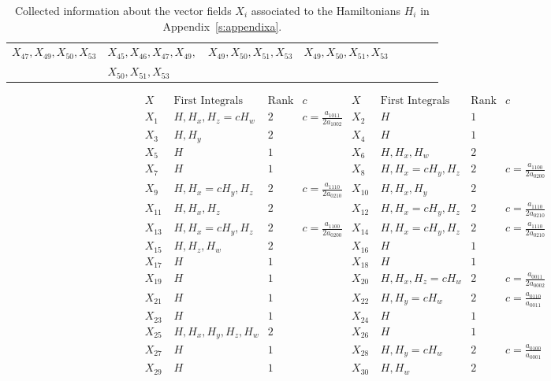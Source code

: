 \documentclass[11pt]{article}
\begin{document}
\begin{center}
\begin{table}[H]
\begin{tabular}{|l|l|l|l|l|l|l|l|}
$X_{47}, X_{49},X_{50},X_{53}$
& $X_{45},X_{46},X_{47},X_{49},$
&$X_{49},X_{50},X_{51},X_{53}$
&$X_{49},X_{50},X_{51},X_{53}$ \\



&$X_{50},X_{51},X_{53}$
& &
\\
  \hline
\end{tabular}
\caption{Collected information about the vector fields $X_i$ associated to the Hamiltonians $H_i$ in  Appendix~\ref{s:appendixa}.}\label{t:table1}
\end{table}
\end{center}




\begin{table}
{\small
 $$
\begin{array}{|c|c|c|c|c|c|c|c|}
\hline
  X \quad  & \mbox{First Integrals}  & \mbox{Rank}& c &X \quad  & \mbox{First Integrals}  & \mbox{Rank}& c\\
  \hline
  \hline
  X_1& H, H_x, H_z=cH_w & 2&  c=\frac{a_{1011}}{2 a_{1002}}&
  X_2 & H  & 1&\\
  X_3 & H,  H_y & 2& &
  X_4 & H  & 1&\\
 X_5 & H & 1 & &
 X_6 & H, H_x,  H_w & 2&\\
 X_7 & H  & 1 & &
 X_8 & H, H_x=cH_y, H_z & 2&c=\frac{a_{1100}}{2 a_{0200}}\\
 X_9 & H, H_x=cH_y, H_z & 2& c=\frac{a_{1110}}{2 a_{0210}}&
 X_{10} & H, H_x, H_y & 2 &\\
 X_{11} & H, H_x,  H_z & 2& &
 X_{12} & H, H_x=cH_y, H_z & 2&c=\frac{a_{1110}}{2 a_{0210}}\\
 X_{13} & H, H_x=cH_y, H_z & 2&c=\frac{a_{1100}}{2 a_{0200}} &
 X_{14} & H, H_x=cH_y, H_z & 2&c=\frac{a_{1110}}{2 a_{0210}}\\
 X_{15} & H,  H_z, H_w & 2& &
 X_{16} & H & 1 &\\
X_{17} & H & 1 & &
X_{18} & H & 1&\\
X_{19} & H & 1& &
X_{20} & H, H_x,  H_z=cH_w & 2&c=\frac{a_{0011}}{2 a_{0002}}\\
X_{21} & H  & 1& &
X_{22} & H,  H_y=cH_w & 2 &c=\frac{a_{0110}}{a_{0011}}\\
X_{23} & H & 1& &
X_{24} & H & 1&\\
X_{25} & H, H_x, H_y, H_z, H_w & 2& &
X_{26} & H & 1&\\
X_{27} & H & 1& &
X_{28} & H, H_y=cH_w & 2&c=\frac{a_{0100}}{a_{0001}}\\
X_{29} & H & 1& &
X_{30} & H, H_w & 2&\\

\end{array}$$}
\end{table}
\end{document}
